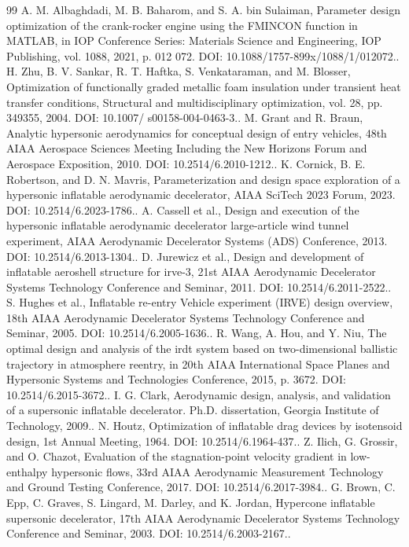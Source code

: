 \documentclass[10pt]{article}
\begin{document}
\begin{sloppypar}
\begin{thebibliography}{99}
 A. M. Albaghdadi, M. B. Baharom, and S. A. bin Sulaiman, Parameter design optimization of the crank-rocker engine using the FMINCON function in MATLAB, in IOP Conference Series: Materials Science and Engineering, IOP Publishing, vol. 1088, 2021, p. 012 072. DOI: 10.1088/1757-899x/1088/1/012072..
 H. Zhu, B. V. Sankar, R. T. Haftka, S. Venkataraman, and M. Blosser, Optimization of functionally graded metallic foam insulation under transient heat transfer conditions, Structural and multidisciplinary optimization, vol. 28, pp. 349355, 2004. DOI: 10.1007/ s00158-004-0463-3..
 M. Grant and R. Braun, Analytic hypersonic aerodynamics for conceptual design of entry vehicles, 48th AIAA Aerospace Sciences Meeting Including the New Horizons Forum and Aerospace Exposition, 2010. DOI: 10.2514/6.2010-1212..
 K. Cornick, B. E. Robertson, and D. N. Mavris, Parameterization and design space exploration of a hypersonic inflatable aerodynamic decelerator, AIAA SciTech 2023 Forum, 2023. DOI: 10.2514/6.2023-1786..
 A. Cassell et al., Design and execution of the hypersonic inflatable aerodynamic decelerator large-article wind tunnel experiment, AIAA Aerodynamic Decelerator Systems (ADS) Conference, 2013. DOI: 10.2514/6.2013-1304..
 D. Jurewicz et al., Design and development of inflatable aeroshell structure for irve-3, 21st AIAA Aerodynamic Decelerator Systems Technology Conference and Seminar, 2011. DOI: 10.2514/6.2011-2522..
 S. Hughes et al., Inflatable re-entry Vehicle experiment (IRVE) design overview, 18th AIAA Aerodynamic Decelerator Systems Technology Conference and Seminar, 2005. DOI: 10.2514/6.2005-1636..
 R. Wang, A. Hou, and Y. Niu, The optimal design and analysis of the irdt system based on two-dimensional ballistic trajectory in atmosphere reentry, in 20th AIAA International Space Planes and Hypersonic Systems and Technologies Conference, 2015, p. 3672. DOI: 10.2514/6.2015-3672..
 I. G. Clark, Aerodynamic design, analysis, and validation of a supersonic inflatable decelerator. Ph.D. dissertation, Georgia Institute of Technology, 2009..
 N. Houtz, Optimization of inflatable drag devices by isotensoid design, 1st Annual Meeting, 1964. DOI: 10.2514/6.1964-437..
 Z. Ilich, G. Grossir, and O. Chazot, Evaluation of the stagnation-point velocity gradient in low-enthalpy hypersonic flows, 33rd AIAA Aerodynamic Measurement Technology and Ground Testing Conference, 2017. DOI: 10.2514/6.2017-3984..
 G. Brown, C. Epp, C. Graves, S. Lingard, M. Darley, and K. Jordan, Hypercone inflatable supersonic decelerator, 17th AIAA Aerodynamic Decelerator Systems Technology Conference and Seminar, 2003. DOI: 10.2514/6.2003-2167..

\end{thebibliography}
\end{sloppypar}
\end{document}

